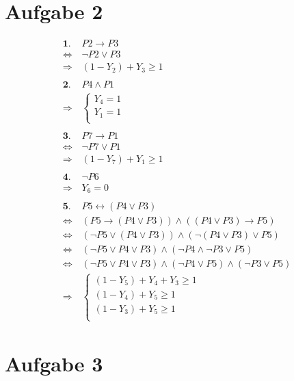 \documentclass[a4paper,11pt]{article}
\begin{document}
\section*{Aufgabe 2}
\begin{align*}
\textbf{1. } & P2 \to P3 \\
\Leftrightarrow & \neg P2 \lor P3 \\
\Rightarrow  & (1 - Y_2) + Y_3 \ge 1 \\ \\
%
\textbf{2. } & P4 \land P1 \\
\Rightarrow  & \left\{\begin{array}{l}
                    Y_4 = 1 \\
                    Y_1 = 1 \\
                \end{array}\right. \\ \\
%
\textbf{3. } & P7 \to P1 \\
\Leftrightarrow & \neg P7 \lor P1 \\
\Rightarrow  & (1 - Y_7) + Y_1 \ge 1 \\ \\
%
\textbf{4. } & \neg P6 \\
\Rightarrow & Y_6 = 0 \\ \\
%
\textbf{5. } & P5 \leftrightarrow (P4 \lor P3) \\
\Leftrightarrow & (P5 \to (P4 \lor P3)) \land ((P4 \lor P3) \to P5) \\
\Leftrightarrow & (\neg P5 \lor (P4 \lor P3)) \land (\neg (P4 \lor P3) \lor P5) \\
\Leftrightarrow & (\neg P5 \lor P4 \lor P3) \land (\neg P4 \land \neg P3 \lor P5) \\
\Leftrightarrow & (\neg P5 \lor P4 \lor P3) \land (\neg P4 \lor P5) \land (\neg P3 \lor P5) \\
\Rightarrow & \left\{\begin{array}{l}
                    (1-Y_5) + Y_4 + Y_3 \ge 1 \\
                    (1-Y_4) + Y_5 \ge 1 \\
                    (1-Y_3) + Y_5 \ge 1 \\
                \end{array}\right.
\end{align*}


\section*{Aufgabe 3}
\end{document}

